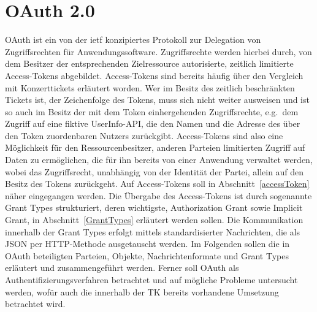 \chapter{OAuth 2.0} \gls{OAuth} ist ein von der \gls{ietf} konzipiertes
Protokoll zur Delegation von Zugriffsrechten für Anwendungssoftware.
Zugriffsrechte werden hierbei durch, von dem Besitzer der entsprechenden
Zielressource autorisierte, zeitlich limitierte Access-Tokens abgebildet.
Access-Tokens sind bereits häufig über den Vergleich mit Konzerttickets
erläutert worden. Wer im Besitz des zeitlich beschränkten Tickets ist, der
Zeichenfolge des Tokens, muss sich nicht weiter ausweisen und ist so auch im
Besitz der mit dem Token einhergehenden Zugriffsrechte, e.g.\ dem Zugriff auf
eine fiktive UserInfo-API, die den Namen und die Adresse des über den Token
zuordenbaren Nutzers zurückgibt. Access-Tokens sind also eine Möglichkeit für
den Ressourcenbesitzer, anderen Parteien limitierten Zugriff auf Daten zu
ermöglichen, die für ihn bereits von einer Anwendung verwaltet werden, wobei das
Zugriffsrecht, unabhängig von der Identität der Partei, allein auf den Besitz des
Tokens zurückgeht. Auf Access-Tokens soll in Abschnitt~\ref{accessToken} näher
eingegangen werden. Die Übergabe des Access-Tokens ist durch sogenannte
\glspl{Grant Type} strukturiert, deren wichtigste, Authorization Grant sowie
Implicit Grant, in Abschnitt~\ref{GrantTypes} erläutert werden sollen. Die
Kommunikation innerhalb der \glspl{Grant Type} erfolgt mittels standardisierter
Nachrichten, die als JSON per HTTP-Methode ausgetauscht werden. Im Folgenden
sollen die in \gls{OAuth} beteiligten Parteien, Objekte, Nachrichtenformate und
\glspl{Grant Type} erläutert und zusammengeführt werden. Ferner soll \gls{OAuth}
als Authentifizierungsverfahren betrachtet und auf mögliche Probleme untersucht
werden, wofür auch die innerhalb der TK bereits vorhandene Umsetzung betrachtet
wird.






